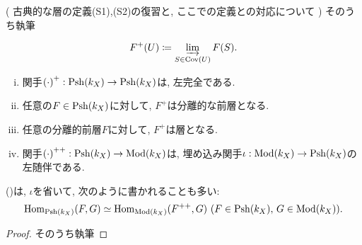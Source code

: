 \documentclass[../main]{subfiles}
\begin{document}
\begin{rem*}
  (
  古典的な層の定義(S1),(S2)の復習と,
  ここでの定義との対応について
  )
  そのうち執筆
\end{rem*}

\begin{dfn}[層化(sheafification)]
  \[
    F^+(U) \coloneqq
    \ilim[S\in\Cov(U)] F(S).
  \]
\end{dfn}

\begin{thm}
  \begin{enumerate}[(i)]
    \item 関手${(\cdot)}^+ : \Psh(k_X)\to\Psh(k_X)$は, 左完全である.
    \item 任意の$F\in\Psh(k_X)$に対して, $F^+$は分離的な前層となる.
    \item 任意の分離的前層$F$に対して, $F^+$は層となる.
    \item 関手${(\cdot)}^{++} : \Psh(k_X)\to\Mod(k_X)$は,
      埋め込み関手$\iota : \Mod(k_X)\to\Psh(k_X)$の左随伴である.
  \end{enumerate}
\end{thm}
()は, $\iota$を省いて, 次のように書かれることも多い:
\[
  \Hom_{\Psh(k_X)}(F,G)
  \simeq
  \Hom_{\Mod(k_X)}(F^{++},G)
  \,\,(F\in\Psh(k_X),\,G\in\Mod(k_X)).
\]
\begin{proof}
  そのうち執筆
\end{proof}
\end{document}
